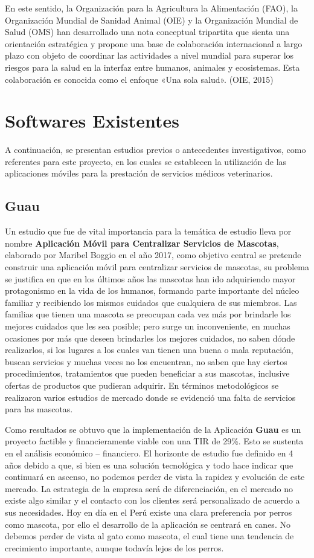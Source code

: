 En este sentido, la Organización para la Agricultura la Alimentación (FAO), la Organización Mundial de Sanidad Animal (OIE) y la Organización Mundial de Salud (OMS) han desarrollado una nota conceptual tripartita que sienta una orientación estratégica y propone una base de colaboración internacional a largo plazo con objeto de coordinar las actividades a nivel mundial para superar los riesgos para la salud en la interfaz entre humanos, animales y ecosistemas. Esta colaboración es conocida como el enfoque «Una sola salud». (OIE, 2015) 
\section{Softwares Existentes}
A continuación, se presentan estudios previos o antecedentes investigativos, como referentes para este proyecto, en los cuales se establecen la utilización de las aplicaciones móviles para la prestación de servicios médicos veterinarios. 
\subsection{Guau}
Un estudio que fue de vital importancia para la temática de estudio lleva por nombre \textbf{Aplicación Móvil para Centralizar Servicios de Mascotas}, elaborado por Maribel Boggio en el año 2017, como objetivo central se pretende construir una aplicación móvil para centralizar servicios de mascotas, su problema se justifica en que en los últimos años las mascotas han ido adquiriendo mayor protagonismo en la vida de los humanos, formando parte importante del núcleo familiar y recibiendo los mismos cuidados que cualquiera de sus miembros. Las familias que tienen una mascota se preocupan cada vez más por brindarle los mejores cuidados que les sea posible; pero surge un inconveniente, en muchas ocasiones por más que deseen brindarles los mejores cuidados, no saben dónde realizarlos, si los lugares a los cuales van tienen una buena o mala reputación, buscan servicios y muchas veces no los encuentran, no saben que hay ciertos procedimientos, tratamientos que pueden beneficiar a sus mascotas, inclusive ofertas de productos que pudieran adquirir. En términos metodológicos se realizaron varios estudios de mercado donde se evidenció una falta de servicios para las mascotas. 

Como resultados se obtuvo que la implementación de la Aplicación \textbf{Guau} es un proyecto factible y financieramente viable con una TIR de 29\%. Esto se sustenta en el análisis económico – financiero. El horizonte de estudio fue definido en 4 años debido a que, si bien es una solución tecnológica y todo hace indicar que continuará en ascenso, no podemos perder de vista la rapidez y evolución de este mercado. La estrategia de la empresa será de diferenciación, en el mercado no existe algo similar y el contacto con los clientes será personalizado de acuerdo a sus necesidades. Hoy en día en el Perú existe una clara preferencia por perros como mascota, por ello el desarrollo de la aplicación se centrará en canes. No debemos perder de vista al gato como mascota, el cual tiene una tendencia de crecimiento importante, aunque todavía lejos de los perros. 
